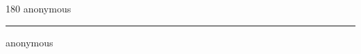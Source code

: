 
\begin{frame}
\begin{center}
\begin{turn}{180}
{\fontsize{2.5cm}{1em}\selectfont anonymous}
\end{turn}
\vspace{1em}\par  
\hrule
\vspace{1em}\par  
{\fontsize{2.5cm}{1em}\selectfont anonymous}
\end{center}
\end{frame}
